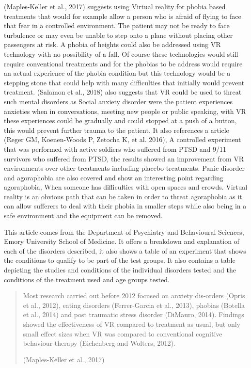 \documentclass[10pt,journal,compsoc]{IEEEtran}
\begin{document}
	 (Maples-Keller et al., 2017) suggests using Virtual reality for phobia based treatments that would for example allow a person who is afraid of flying to face that fear in a controlled environment. The patient may not be ready to face turbulence or may even be unable to step onto a plane without placing other passengers at risk. A phobia of heights could also be addressed using VR technology with no possibility of a fall. Of course these technologies would still require conventional treatments and for the phobias to be address would require an actual experience of the phobia condition but this technology would be a stepping stone that could help with many difficulties that initially would prevent treatment. (Salamon et al., 2018) also suggests that VR could be used to threat such mental disorders as Social anxiety disorder were the patient experiences anxieties when in conversations, meeting new people or public speaking, with VR these experiences could be  gradually and could stopped at a push of a button, this would prevent further trauma to the patient. It also references a article (Reger GM, Koenen-Woods P, Zetocha K, et al. 2016), A controlled experiment that was performed with active soldiers who suffered from PTSD and 9/11 survivors who suffered from PTSD, the results showed an improvement from VR environments over other treatments including placebo treatments. Panic disorder and agoraphobia are also covered and show an interesting point regarding agoraphobia, When someone has difficulties with open spaces and crowds. Virtual reality is an obvious path that can be taken in order to threat agoraphobia as it can allow sufferers to deal with their phobia in smaller steps while also being in a safe environment and the equipment can be removed. \newline
	 
	 This article comes from the Department of Psychiatry and Behavioural Sciences, Emory University School of Medicine. It offers a breakdown and explanation of each of the disorders described, it also shows a table of an experiment that shows the conditions to qualify to be part of the test groups. It also contains a table depicting the studies and conditions of the individual disorders tested and the conditions of the treatment used and age groups tested. \newline \newline

	\begin{quotation}
		 Most research carried out before 2012 focused on anxiety dis-orders (Opris et al., 2012), eating disorders (Ferrer-Garcia et al., 2013), phobias (Botella et al., 2014) and post traumatic stress disorder (DiMauro, 2014). Findings showed the effectiveness of VR compared to treatment as usual, but only small effect sizes when VR was compared to conventional cognitive behaviour therapy (Eichenberg and Wolters, 2012).\newline 
		 
		 (Maples-Keller et al., 2017)
	\end{quotation}
\end{document}
